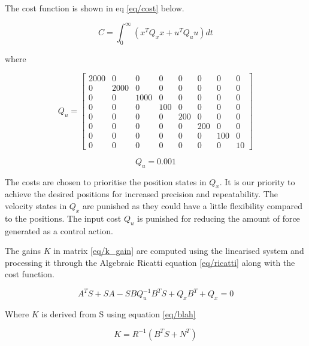 \documentclass{UoNMCHA}
\numberwithin{equation}{section}
\begin{document}
	The cost function is shown in eq \eqref{eq/cost} below.
	
	\begin{equation} \label{eq/cost}
	C=\int_{0}^{\infty}\left(x^{T} Q_{x} x+u^{T} Q_{u} u\right) d t
	\end{equation}
		
	where
	
	\begin{equation}
	Q_u = 
	\begin{bmatrix}2000 & 0 & 0 & 0 & 0 & 0 & 0 & 0 \\ 0 & 2000 & 0 & 0 & 0 & 0 & 0 & 0 \\ 0 & 0 & 1000 & 0 & 0 & 0 & 0 & 0 \\ 0 & 0 & 0 & 100 & 0 & 0 & 0 & 0 \\ 0 & 0 & 0 & 0 & 200 & 0 & 0 & 0 \\ 0 & 0 & 0 & 0 & 0 & 200 & 0 & 0 \\ 0 & 0 & 0 & 0 & 0 & 0 & 100 & 0 \\ 0 & 0 & 0 & 0 & 0 & 0 & 0 & 10\end{bmatrix}
	\end{equation}
	
	\begin{equation}
	Q_{u}=0.001
	\end{equation}
	
	The costs are chosen to prioritise the position states in $Q_{x}$. It is our priority to achieve the desired
	positions for increased precision and repeatability. The velocity states in $Q_{x}$ are punished as they could
	have a little flexibility compared to the positions. The input cost $Q_{u}$ is punished for reducing the amount
	of force generated as a control action.
	
	\newpage
	
	The gains $K$ in matrix \eqref{eq/k_gain} are computed using the linearised system and processing it through the
	Algebraic Ricatti equation \eqref{eq/ricatti} along with the cost function.
	
	\begin{equation}\label{eq/ricatti}
	A^{T} S+S A-S B Q_{u}^{-1} B^{T} S+Q_{x} B^{T}+Q_{x}=0
	\end{equation}

	Where ${K}$ is derived from S using equation \eqref{eq/blah}
	
	\begin{equation}\label{eq/blah}
	K=R^{-1}\left(B^{T} S+N^{T}\right)
	\end{equation}
\end{document}
